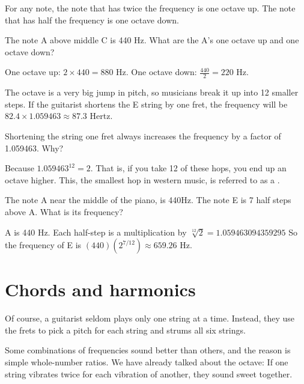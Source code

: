 For any note, the note that has twice the frequency is one octave
up. The note that has half the frequency is one octave down.

\begin{Worked}
\begin{Problem}
The note A above middle C is 440 Hz. What are the
A's one octave up and one octave down?
\end{Problem}
\begin{Solution}
One octave up: $2 \times 440 = 880$ Hz. One octave down:
$\frac{440}{2} = 220$ Hz.
\end{Solution}
\end{Worked}

The octave is a very big jump in pitch, so musicians break it up into
12 smaller steps. If the guitarist shortens the E string by one fret,
the frequency will be $82.4 \times 1.059463 \approx 87.3$ Hertz. 

Shortening the string one fret always increases the frequency by a factor of 1.059463. Why?

Because $1.059463^{12} = 2$. That is, if you take 12 of these hops, you
end up an octave higher.
This, the smallest hop in western music, is referred to as a .

\begin{Exercise}[title={Notes and frequencies}, label=note_to_frequency]

The note A near the middle of the piano, is 440Hz. The note E is 7 half steps above A.  What is its frequency?
 
\end{Exercise}
\begin{Answer}[ref=note_to_frequency]

  A is 440 Hz.  Each half-step is a multiplication by $\sqrt[12]{2} = 1.059463094359295$
  So the frequency of E is $(440)(2^{7/12}) \approx 659.26$ Hz.

\end{Answer}


\section{Chords and harmonics}

Of course, a guitarist seldom plays only one string at a
time. Instead, they use the frets to pick a pitch for each string and
strums all six strings.

Some combinations of frequencies sound better than others, and the
reason is simple whole-number ratios. We have
already talked about the octave: If one string vibrates twice for each
vibration of another, they sound sweet together.


